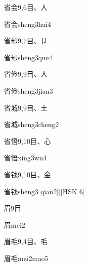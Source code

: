 \begin{Entry}{省会}{9,6}{⽬、⼈}
  \begin{Phonetics}{省会}{sheng3hui4}
  \end{Phonetics}
\end{Entry}

\begin{Entry}{省却}{9,7}{⽬、⼙}
  \begin{Phonetics}{省却}{sheng3que4}
  \end{Phonetics}
\end{Entry}

\begin{Entry}{省俭}{9,9}{⽬、⼈}
  \begin{Phonetics}{省俭}{sheng3jian3}
  \end{Phonetics}
\end{Entry}

\begin{Entry}{省城}{9,9}{⽬、⼟}
  \begin{Phonetics}{省城}{sheng3cheng2}
  \end{Phonetics}
\end{Entry}

\begin{Entry}{省悟}{9,10}{⽬、⼼}
  \begin{Phonetics}{省悟}{xing3wu4}
  \end{Phonetics}
\end{Entry}

\begin{Entry}{省钱}{9,10}{⽬、⾦}
  \begin{Phonetics}{省钱}{sheng3 qian2}[][HSK 6]
  \end{Phonetics}
\end{Entry}

\begin{Entry}{眉}{9}{⽬}
  \begin{Phonetics}{眉}{mei2}
  \end{Phonetics}
\end{Entry}

\begin{Entry}{眉毛}{9,4}{⽬、⽑}
  \begin{Phonetics}{眉毛}{mei2mao5}
  \end{Phonetics}
\end{Entry}

